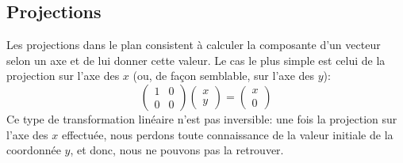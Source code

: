 \subsection{Projections}
Les projections dans le plan consistent à calculer la composante d'un vecteur
selon un axe et de lui donner cette valeur.  Le cas le plus simple est
celui de la projection sur l'axe des $x$ (ou, de façon semblable, sur l'axe
des $y$):
\[
\begin{pmatrix}
1 & 0 \\
0 & 0
\end{pmatrix}
\begin{pmatrix}
x \\ y
\end{pmatrix}
= \begin{pmatrix}
x\\0
\end{pmatrix}
\]
Ce type de transformation linéaire n'est pas inversible: une fois la projection
sur l'axe des $x$ effectuée, nous perdons toute connaissance de la valeur
initiale de la coordonnée $y$, et donc, nous ne pouvons pas la retrouver.

